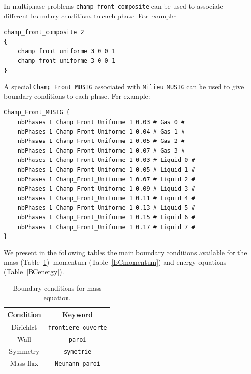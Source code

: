 In multiphase problems \texttt{champ\_front\_composite} can be used to associate different boundary conditions to each phase. For example:
\begin{lstlisting}
champ_front_composite 2
{
    champ_front_uniforme 3 0 0 1
    champ_front_uniforme 3 0 0 1
}
\end{lstlisting}
A special \texttt{Champ\_Front\_MUSIG} associated with \texttt{Milieu_MUSIG} can be used to give boundary conditions to each phase. For example: 
\begin{lstlisting}
Champ_Front_MUSIG {
    nbPhases 1 Champ_Front_Uniforme 1 0.03 # Gas 0 #
    nbPhases 1 Champ_Front_Uniforme 1 0.04 # Gas 1 #
    nbPhases 1 Champ_Front_Uniforme 1 0.05 # Gas 2 #
    nbPhases 1 Champ_Front_Uniforme 1 0.07 # Gas 3 #
    nbPhases 1 Champ_Front_Uniforme 1 0.03 # Liquid 0 #
    nbPhases 1 Champ_Front_Uniforme 1 0.05 # Liquid 1 #
    nbPhases 1 Champ_Front_Uniforme 1 0.07 # Liquid 2 #
    nbPhases 1 Champ_Front_Uniforme 1 0.09 # Liquid 3 #
    nbPhases 1 Champ_Front_Uniforme 1 0.11 # Liquid 4 #
    nbPhases 1 Champ_Front_Uniforme 1 0.13 # Liquid 5 #
    nbPhases 1 Champ_Front_Uniforme 1 0.15 # Liquid 6 #
    nbPhases 1 Champ_Front_Uniforme 1 0.17 # Liquid 7 #
}
\end{lstlisting}
We present in the following tables the main boundary conditions available for the mass (Table~\ref{BCmass}), momentum (Table~\ref{BCmomentum}) and energy equations (Table~\ref{BCenergy}).

\begin{table}[!ht]
    \centering
    \begin{tabular}{ c c }
        \toprule
        Condition & Keyword \\
        \midrule
        \rowcolor[gray]{0.9} Dirichlet & \texttt{frontiere\_ouverte} \\
        Wall & \texttt{paroi} \\
        \rowcolor[gray]{0.9} Symmetry & \texttt{symetrie} \\
        Mass flux & \texttt{Neumann\_paroi} \\
        \bottomrule
    \end{tabular}
    \caption{Boundary conditions for mass equation.}\label{BCmass}
\end{table}

